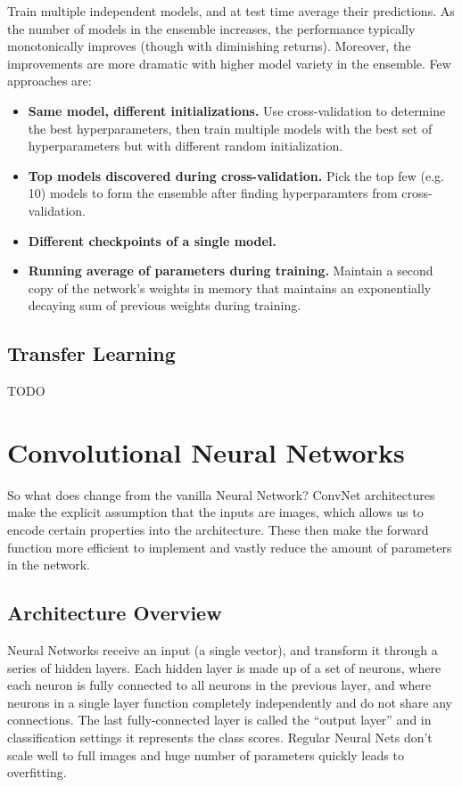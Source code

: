 \documentclass[letterpaper]{article}
\begin{document}
Train multiple independent models, and at test time average their predictions. As the number of models in the ensemble increases, the performance typically monotonically improves (though with diminishing returns). Moreover, the improvements are more dramatic with higher model variety in the ensemble. Few approaches are:

\begin{itemize}
	\item \textbf{Same model, different initializations.} Use cross-validation to determine the best hyperparameters, then train multiple models with the best set of hyperparameters but with different random initialization.
	\item \textbf{Top models discovered during cross-validation.} Pick the top few (e.g. 10) models to form the ensemble after finding hyperparamters from cross-validation.
	\item \textbf{Different checkpoints of a single model.}
	\item \textbf{Running average of parameters during training.} Maintain a second copy of the network’s weights in memory that maintains an exponentially decaying sum of previous weights during training.
\end{itemize}

\subsection{Transfer Learning}

TODO

\section{Convolutional Neural Networks}

So what does change from the vanilla Neural Network? ConvNet architectures make the explicit assumption that the inputs are images, which allows us to encode certain properties into the architecture. These then make the forward function more efficient to implement and vastly reduce the amount of parameters in the network.

\subsection{Architecture Overview}

Neural Networks receive an input (a single vector), and transform it through a series of hidden layers. Each hidden layer is made up of a set of neurons, where each neuron is fully connected to all neurons in the previous layer, and where neurons in a single layer function completely independently and do not share any connections. The last fully-connected layer is called the “output layer” and in classification settings it represents the class scores. Regular Neural Nets don’t scale well to full images and huge number of parameters quickly leads to overfitting.
\end{document}
